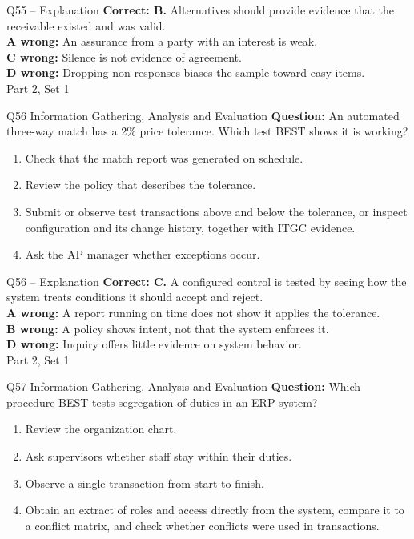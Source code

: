 \documentclass[aspectratio=169,10pt]{beamer}
\begin{document}
\begin{frame}[t]{Q55 -- Explanation}
	\footnotesize
	\textbf{Correct: B.} Alternatives should provide evidence that the receivable existed and was valid. \\[5pt]
\textbf{A wrong:} An assurance from a party with an interest is weak. \\[3pt]
\textbf{C wrong:} Silence is not evidence of agreement. \\[3pt]
\textbf{D wrong:} Dropping non-responses biases the sample toward easy items. \\[3pt]
	\vfill {\tiny Part 2, Set 1}
\end{frame}
\begin{frame}[t]{Q56 \hfill {\scriptsize Information Gathering, Analysis and Evaluation}}
	\small
	\textbf{Question:} An automated three-way match has a 2\% price tolerance. Which test BEST shows it is working?
	\begin{enumerate}[label=\Alph*.,itemsep=1pt,topsep=3pt]
			\item Check that the match report was generated on schedule.
			\item Review the policy that describes the tolerance.
			\item Submit or observe test transactions above and below the tolerance, or inspect configuration and its change history, together with ITGC evidence.
			\item Ask the AP manager whether exceptions occur.
	\end{enumerate}
\end{frame}
\begin{frame}[t]{Q56 -- Explanation}
	\footnotesize
	\textbf{Correct: C.} A configured control is tested by seeing how the system treats conditions it should accept and reject. \\[5pt]
\textbf{A wrong:} A report running on time does not show it applies the tolerance. \\[3pt]
\textbf{B wrong:} A policy shows intent, not that the system enforces it. \\[3pt]
\textbf{D wrong:} Inquiry offers little evidence on system behavior. \\[3pt]
	\vfill {\tiny Part 2, Set 1}
\end{frame}
\begin{frame}[t]{Q57 \hfill {\scriptsize Information Gathering, Analysis and Evaluation}}
	\small
	\textbf{Question:} Which procedure BEST tests segregation of duties in an ERP system?
	\begin{enumerate}[label=\Alph*.,itemsep=1pt,topsep=3pt]
			\item Review the organization chart.
			\item Ask supervisors whether staff stay within their duties.
			\item Observe a single transaction from start to finish.
			\item Obtain an extract of roles and access directly from the system, compare it to a conflict matrix, and check whether conflicts were used in transactions.
	\end{enumerate}
\end{frame}
\end{document}
